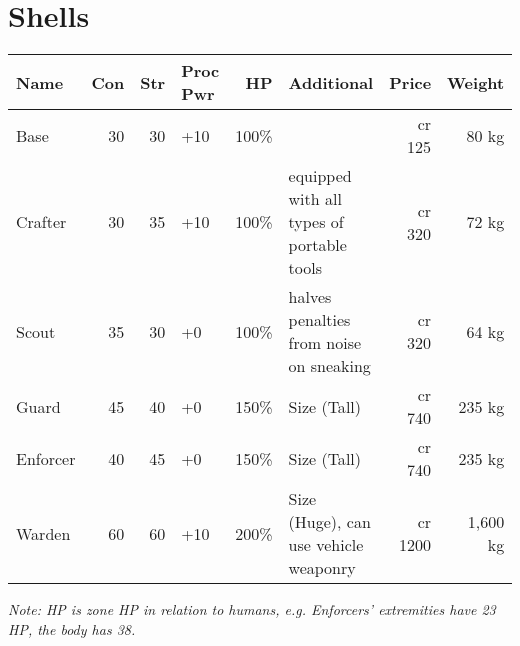 \documentclass[12pt,a4paper,openany]{book}
\begin{document}
	\section{Shells}
	\begin{tabularx}{\textwidth}{|l|r|r|l|r|X|r|r|}
		\hline
		Name & Con & Str & Proc Pwr & HP & Additional & Price & Weight \\ \hline
		Base & 30 & 30 & +10 & 100\% & & cr 125 & 80 kg \\ \hline
		Crafter & 30 & 35 & +10 & 100\% & equipped with all types of portable tools & cr 320 & 72 kg \\ \hline
		Scout & 35 & 30 & +0 & 100\% & halves penalties from noise on sneaking & cr 320 & 64 kg \\ \hline
		Guard & 45 & 40 & +0 & 150\% & Size (Tall) & cr 740 & 235 kg \\ \hline
		Enforcer & 40 & 45 & +0 & 150\% & Size (Tall) & cr 740 & 235 kg \\ \hline
		Warden & 60 & 60 & +10 & 200\% & Size (Huge), can use vehicle weaponry & cr 1200 & 1,600 kg \\ \hline
	\end{tabularx}
	\textit{Note: HP is zone HP in relation to humans, e.g. Enforcers' extremities have 23 HP, the body has 38.}
\end{document}
